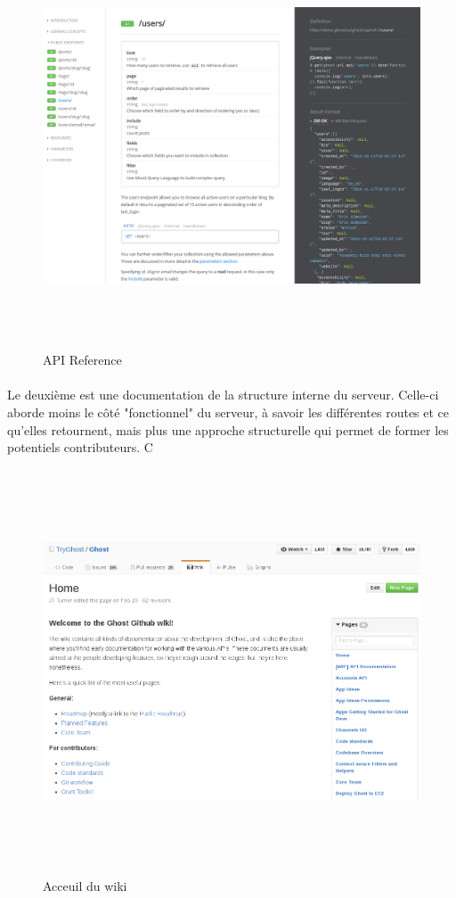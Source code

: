         \begin{figure}[h]
            \centering
            \includegraphics[height=12cm]{./assets/ghost2.png}
            \caption{API Reference}
        \end{figure}

        \newpage
        \paragraph{}
            Le deuxième est une documentation de la structure interne du serveur. Celle-ci aborde moins
            le côté "fonctionnel" du serveur, à savoir les différentes routes et ce qu'elles retournent, mais
            plus une approche structurelle qui permet de former les potentiels contributeurs. C

        \begin{figure}[h]
            \centering
            \includegraphics[height=12cm]{./assets/ghost3.png}
            \caption{Acceuil du wiki}
        \end{figure}
